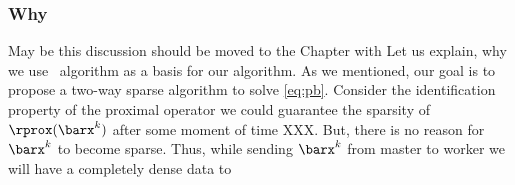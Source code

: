 \subsubsection{Why \dave}
{\color{yellow} May be this discussion should be moved to the Chapter with \spy}
Let us explain, why we use \dave~algorithm as a basis for our algorithm. As we mentioned, our goal is to propose a two-way sparse algorithm to solve \eqref{eq:pb}. Consider the identification property of the proximal operator we could guarantee the sparsity of $\rprox(\barx^k)$ after some moment of time {\color{red}XXX}. But, there is no reason for $\barx^k$ to become sparse. Thus, while sending $\barx^k$ from master to worker we will have a completely dense data to 